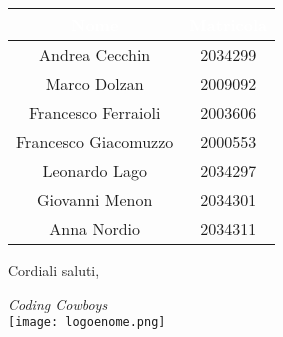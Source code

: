 \documentclass[12pt]{article}
\begin{document}
\begin{center}
    \begingroup
    \setlength{\tabcolsep}{10pt}
    \renewcommand{\arraystretch}{1.5}
    \begin{tabular}{| c | c |}
        \hline
        \rowcolor{headerrow}\textbf{\textcolor{white}{Nome}} & \textbf{\textcolor{white}{Matricola}} \\
        \hline
        Andrea Cecchin & 2034299 \\
        \hline
        Marco Dolzan & 2009092\\
        \hline
        Francesco Ferraioli & 2003606\\
        \hline
        Francesco Giacomuzzo & 2000553\\
        \hline
        Leonardo Lago & 2034297\\
        \hline
        Giovanni Menon & 2034301\\
        \hline
        Anna Nordio & 2034311\\
        \hline
    \end{tabular}
    \endgroup
\end{center}
\vspace{15pt}
\begin{flushleft}
    Cordiali saluti,
\end{flushleft}
\begin{flushright}
    \textit{Coding Cowboys}    \\
    {\texttt{[image: logoenome.png]}}
\end{flushright}
\end{document}
